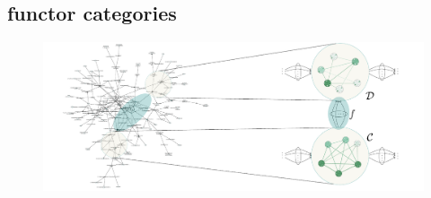 
\subsection{functor categories}

\begin{frame}
\begin{figure}
\noindent\includegraphics[width=1.0\framewidth]{fig/biograph.pdf}
\label{fig:biograph}
\end{figure}
\end{frame}

